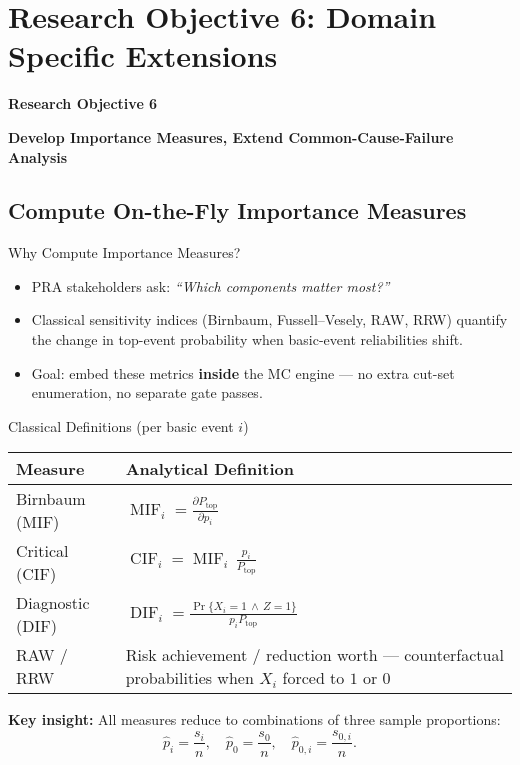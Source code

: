 
\section{Research Objective 6: Domain Specific Extensions}
\begin{frame}
    \Large{\centerline{\textbf{Research Objective 6}}}
    \vspace{6pt}
    \large{\centerline{\textbf{Develop Importance Measures, Extend Common-Cause-Failure Analysis}}}
\end{frame}

\subsection{Compute On-the-Fly Importance Measures}
\begin{frame}{Why Compute Importance Measures?}
  \begin{itemize}
    \item PRA stakeholders ask: \emph{“Which components matter most?”}
    \item Classical sensitivity indices (Birnbaum, Fussell–Vesely, RAW, RRW) quantify
          the change in top-event probability when basic-event reliabilities shift.
    \item Goal: embed these metrics \textbf{inside} the MC engine — no extra cut-set enumeration, no separate gate passes.
  \end{itemize}
  \vspace{6pt}
  \centering
\end{frame}

\begin{frame}{Classical Definitions (per basic event $i$)}
\footnotesize
\begin{tabular}{l p{12cm}}
\toprule
\textbf{Measure} & \textbf{Analytical Definition}\\
\midrule
Birnbaum (MIF) & $\displaystyle \operatorname{MIF}_i = \frac{\partial P_{\text{top}}}{\partial p_i}$\\[4pt]
Critical (CIF) & $\displaystyle \operatorname{CIF}_i = \operatorname{MIF}_i\,\frac{p_i}{P_{\text{top}}}$\\[4pt]
Diagnostic (DIF) & $\displaystyle \operatorname{DIF}_i = \frac{\Pr\{X_i=1\,\wedge\,Z=1\}}{p_i P_{\text{top}}}$\\[4pt]
RAW / RRW & Risk achievement / reduction worth — counterfactual probabilities when $X_i$ forced to $1$ or $0$\\
\bottomrule
\end{tabular}
\pause
\vspace{4pt}
\textbf{Key insight:}\; All measures reduce to combinations of three sample proportions:
\[ \widehat p_i = \frac{s_i}{n},\quad \widehat p_0=\frac{s_0}{n},\quad \widehat p_{0,i}=\frac{s_{0,i}}{n}. \]
\end{frame}

